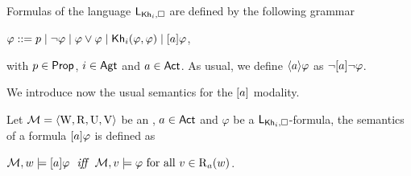 \medskip

\begin{definition}\label{def:khimlsyntax}
Formulas of the language $\mathsf{L}_{{\sf Kh}_i,\square}$ are defined by the following grammar
\begin{spcenter}
$\varphi ::= p \mid \neg\varphi \mid \varphi\vee\varphi \mid {\sf Kh}_i(\varphi,\varphi) \mid [a]\varphi$,
\end{spcenter}
with $p \in {\rm \sf Prop}$, $i \in {\rm \sf Agt}$ and $a \in {\rm \sf Act}$.
As usual, we define $\langle a \rangle\varphi$ as $\neg[a]\neg\varphi$. %
\end{definition}

\medskip

We introduce now the usual semantics for the $[a]$ modality.

\medskip

\begin{definition}\label{def:khimlsemantics}
Let $\mathcal{M} = \langle \operatorname{W}, \operatorname{R}, \operatorname{U}, \operatorname{V} \rangle$ be an \ults, $a \in {\rm \sf Act}$ and $\varphi$ be a $\mathsf{L}_{{\sf Kh}_i,\square}$-formula, the semantics of a formula $[a]\varphi$ is defined as
\begin{spcenter}
$\modults,w \models \mlbox{a}\varphi \ \ \iff \ \ \modults,v \models \varphi \mbox{ for all }v \in \R_a(w)$.
\end{spcenter}
\end{definition}
